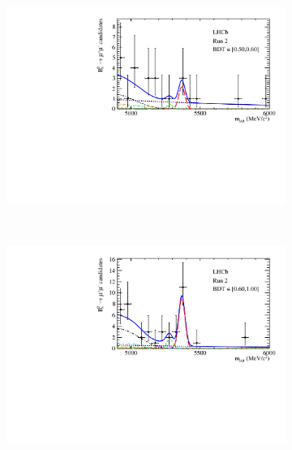 {{\begin{figure}[htbp]
\begin{subfigure}[b]{0.48\textwidth}
        \includegraphics[width=\textwidth]{./Figs/BFAnalysis/Bsmumu_Fit_Run2_bin4.pdf}
    \end{subfigure}
    ~ %
    \begin{subfigure}[b]{0.48\textwidth}
       \includegraphics[width=\textwidth]{./Figs/BFAnalysis/Bsmumu_Fit_Run2_bin5.pdf}
    \end{subfigure}


\end{figure}}}
